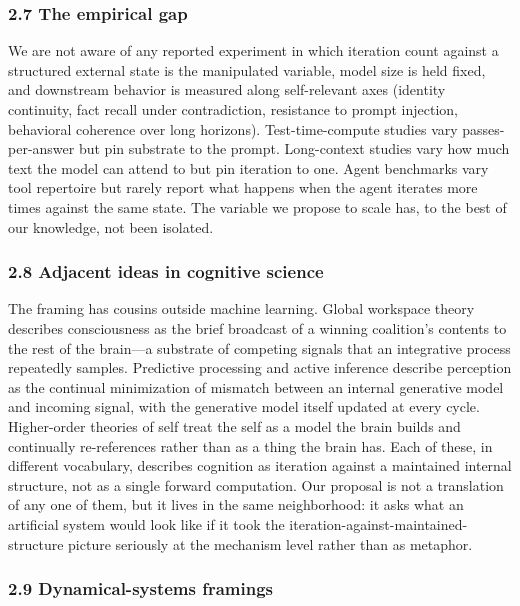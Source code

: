 \documentclass[11pt,letterpaper]{article}
\begin{document}
\subsubsection*{2.7 The empirical gap}

We are not aware of any reported experiment in which iteration count against a structured external state is the manipulated variable, model size is held fixed, and downstream behavior is measured along self-relevant axes (identity continuity, fact recall under contradiction, resistance to prompt injection, behavioral coherence over long horizons). Test-time-compute studies vary passes-per-answer but pin substrate to the prompt. Long-context studies vary how much text the model can attend to but pin iteration to one. Agent benchmarks vary tool repertoire but rarely report what happens when the agent iterates more times against the same state. The variable we propose to scale has, to the best of our knowledge, not been isolated.

\subsubsection*{2.8 Adjacent ideas in cognitive science}

The framing has cousins outside machine learning. Global workspace theory describes consciousness as the brief broadcast of a winning coalition's contents to the rest of the brain---a substrate of competing signals that an integrative process repeatedly samples. Predictive processing and active inference describe perception as the continual minimization of mismatch between an internal generative model and incoming signal, with the generative model itself updated at every cycle. Higher-order theories of self treat the self as a model the brain builds and continually re-references rather than as a thing the brain has. Each of these, in different vocabulary, describes cognition as iteration against a maintained internal structure, not as a single forward computation. Our proposal is not a translation of any one of them, but it lives in the same neighborhood: it asks what an artificial system would look like if it took the iteration-against-maintained-structure picture seriously at the mechanism level rather than as metaphor.

\subsubsection*{2.9 Dynamical-systems framings}
\end{document}
